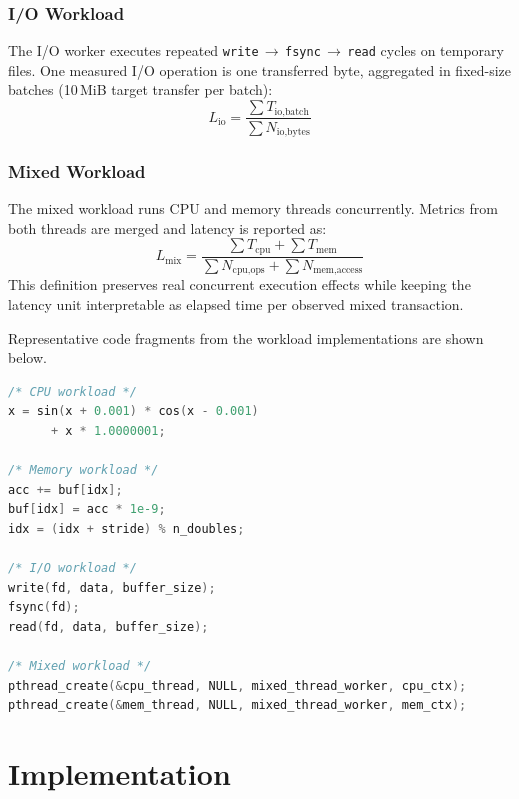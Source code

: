 \documentclass[conference]{IEEEtran}
\begin{document}
\subsubsection{I/O Workload}
The I/O worker executes repeated
\texttt{write}\,$\rightarrow$\,\texttt{fsync}\,$\rightarrow$\,\texttt{read}
cycles on temporary files.  One measured I/O operation is one transferred byte,
aggregated in fixed-size batches (10\,MiB target transfer per batch):
\begin{equation}
L_{\text{io}} = \frac{\sum T_{\text{io,batch}}}{\sum N_{\text{io,bytes}}}
\end{equation}

\subsubsection{Mixed Workload}
The mixed workload runs CPU and memory threads concurrently.  Metrics from both
threads are merged and latency is reported as:
\begin{equation}
L_{\text{mix}} = \frac{\sum T_{\text{cpu}} + \sum T_{\text{mem}}}{\sum N_{\text{cpu,ops}} + \sum N_{\text{mem,access}}}
\end{equation}
This definition preserves real concurrent execution effects while keeping the
latency unit interpretable as elapsed time per observed mixed transaction.

Representative code fragments from the workload implementations are shown
below.
\begin{lstlisting}[language=C,basicstyle=\ttfamily\scriptsize,columns=fullflexible,breaklines=true,breakatwhitespace=false,postbreak=\mbox{\textcolor{gray}{$\hookrightarrow$}\space}]
/* CPU workload */
x = sin(x + 0.001) * cos(x - 0.001)
      + x * 1.0000001;

/* Memory workload */
acc += buf[idx];
buf[idx] = acc * 1e-9;
idx = (idx + stride) % n_doubles;

/* I/O workload */
write(fd, data, buffer_size);
fsync(fd);
read(fd, data, buffer_size);

/* Mixed workload */
pthread_create(&cpu_thread, NULL, mixed_thread_worker, cpu_ctx);
pthread_create(&mem_thread, NULL, mixed_thread_worker, mem_ctx);
\end{lstlisting}

\section{Implementation}
\label{sec:implementation}
\end{document}

